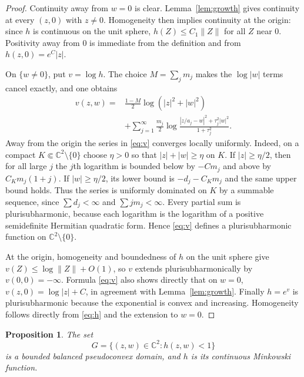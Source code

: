 \documentclass{amsart}
\newcommand{\C}{\mathbb C}
\newtheorem{proposition}[theorem]{Proposition}
\theoremstyle{remark}
\begin{document}
\begin{proof}
Continuity away from $w=0$ is clear. Lemma~\ref{lem:growth} gives continuity at every $(z,0)$ with $z\ne0$. Homogeneity then implies continuity at the origin: since $h$ is continuous on the unit sphere, $h(Z)\le C_1\|Z\|$ for all $Z$ near $0$. Positivity away from $0$ is immediate from the definition and from $h(z,0)=e^C|z|$.

On $\{w\ne0\}$, put $v=\log h$. The choice $M=\sum_jm_j$ makes the $\log|w|$ terms cancel exactly, and one obtains
\begin{equation}\label{eq:v}
\begin{split}
 v(z,w)={}&\frac{1-M}{2}\log(|z|^2+|w|^2)\\
 &+\sum_{j=1}^{\infty}\frac{m_j}{2}
 \log\frac{|z/a_j-w|^2+\tau_j^2|w|^2}{1+\tau_j^2}.
\end{split}
\end{equation}
Away from the origin the series in \eqref{eq:v} converges locally uniformly. Indeed, on a compact $K\Subset\C^2\setminus\{0\}$ choose $\eta>0$ so that $|z|+|w|\ge\eta$ on $K$. If $|z|\ge\eta/2$, then for all large $j$ the $j$th logarithm is bounded below by $-Cm_j$ and above by $C_Km_j(1+j)$. If $|w|\ge\eta/2$, its lower bound is $-d_j-C_Km_j$ and the same upper bound holds. Thus the series is uniformly dominated on $K$ by a summable sequence, since $\sum d_j<\infty$ and $\sum jm_j<\infty$. Every partial sum is plurisubharmonic, because each logarithm is the logarithm of a positive semidefinite Hermitian quadratic form. Hence \eqref{eq:v} defines a plurisubharmonic function on $\C^2\setminus\{0\}$.

At the origin, homogeneity and boundedness of $h$ on the unit sphere give $v(Z)\le\log\|Z\|+O(1)$, so $v$ extends plurisubharmonically by $v(0,0)=-\infty$. Formula \eqref{eq:v} also shows directly that on $w=0$, $v(z,0)=\log|z|+C$, in agreement with Lemma~\ref{lem:growth}. Finally $h=e^v$ is plurisubharmonic because the exponential is convex and increasing. Homogeneity follows directly from \eqref{eq:h} and the extension to $w=0$.
\end{proof}

\begin{proposition}\label{prop:G}
The set
\begin{equation}\label{eq:G}
 G=\{(z,w)\in\C^2:h(z,w)<1\}
\end{equation}
is a bounded balanced pseudoconvex domain, and $h$ is its continuous Minkowski function.
\end{proposition}
\end{document}
